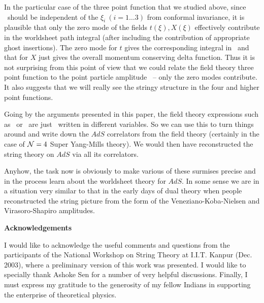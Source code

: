 In the particular case of the three point function that we studied above, 
since \adsmom\ should be independent of the $\xi_i ~(i=1\ldots 3)$ from conformal
invariance, it is plausible that only the zero mode of the fields $t(\xi), X(\xi)$
effectively contribute in the worldsheet path integral 
(after including the contribution of appropriate ghost insertions). 
The zero mode for $t$ gives the 
corresponding integral in \btob\ and that for $X$ just gives the overall momentum 
conserving delta function. Thus it is not surprising from this point of view that 
we could relate the field theory three point function to the point particle
amplitude \posbtob\ -- only the zero modes contribute. 
It also suggests that we will really see the stringy structure in the
four and higher point functions. 

Going by the arguments presented in this paper, 
the field theory expressions such as \totcont\ or \cellcont\ are just 
\adsmom\ written
in different variables. So we can use this to
turn things around and write down the $AdS$ 
correlators from the field theory (certainly in the case of 
${\cal N}=4$ Super Yang-Mills theory). We would then have 
reconstructed the string theory on $AdS$ 
via all its correlators. 

Anyhow, the task now is 
obviously to make various of these surmises precise
and in the process learn about the worldsheet theory for $AdS$.
In some sense we are in a situation very similar to that in the early 
days of dual theory
when people reconstructed the string picture from the form of the 
Veneziano-Koba-Nielsen and Virasoro-Shapiro amplitudes. 

\medskip
\centerline{\bf Acknowledgements}

I would like to acknowledge the useful comments and questions from the participants 
of the National Workshop on String Theory at I.I.T. Kanpur (Dec. 2003), 
where a preliminary version of this work was presented. I would like to specially thank 
Ashoke Sen for a number of very helpful discussions. Finally, I must express my 
gratitude to the generosity of my fellow Indians in supporting the enterprise of 
theoretical physics. 


